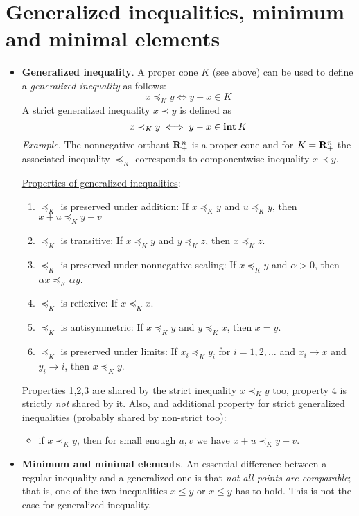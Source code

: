 \documentclass[a4paper, oneside]{book}
\begin{document}
\section{Generalized inequalities, minimum and minimal elements}
\begin{itemize}
\item \textbf{Generalized inequality}. A proper cone $K$ (see above) can be used to define a \textit{generalized inequality} as follows:
$$x\preceq_K y \iff y-x \in K$$
A strict generalized inequality $x \prec y$ is defined as
$$x \prec_K y \iff y-x \in \textbf{int}\,K$$
%
\textit{Example.} The nonnegative orthant $\mathbf R_+^n$ is a proper cone and for $K = \mathbf R_+^n$ the associated inequality $\preceq_K$  corresponds to componentwise inequality $x\prec y$.

\underline{Properties of generalized inequalities}:
	\begin{enumerate}
	\item $\preceq_K$ is preserved under addition: If $x \preceq_K y$ and $u \preceq_K y$, then $x+u \preceq_K y+v$
	\item $\preceq_K$ is transitive: If $x \preceq_K y$ and $y \preceq_K z$, then $x \preceq_K z$.
	\item $\preceq_K$ is preserved under nonnegative scaling: If $x\preceq_K y$ and $\alpha > 0$, then $\alpha  x \preceq_K \alpha y$.
	\item $\preceq_K$ is reflexive: If $x \preceq_K x$.
	\item $\preceq_K$ is antisymmetric: If $x \preceq_K y$ and $y \preceq_K x$, then $x = y$.
	\item $\preceq_K$ is preserved under limits: If $x_i \preceq_K y_i$ for $i=1,2,\hdots$ and $x_i \to x$ and $y_i \to i$, then $x \preceq_K y$. 
	\end{enumerate}
	
Properties 1,2,3 are shared by the strict inequality $x \prec_K y$ too, property 4 is strictly \textit{not} shared by it. Also, and additional property for strict generalized inequalities (probably shared by non-strict too):
	\begin{itemize}
	\item if $x\prec_K y$, then for small enough $u,v$ we have $x+u\prec_K y+v$.
	\end{itemize}
\item \textbf{Minimum and minimal elements}. An essential difference between a regular inequality and a generalized one is that \textit{not all points are comparable}; that is, one of the two inequalities $x \le y$ or $x \le y$ has to hold. This is not the case for generalized inequality.


\end{itemize}
\end{document}
